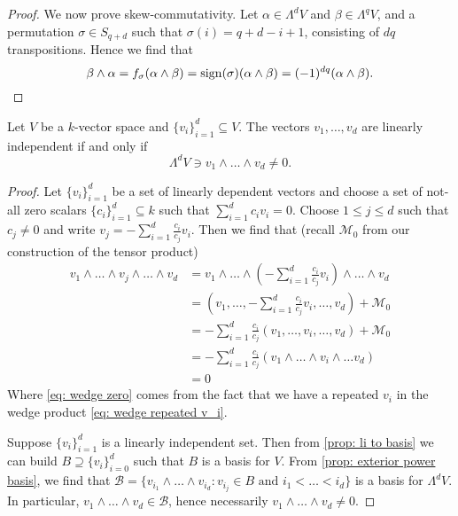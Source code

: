 \begin{proof}
    We now prove skew-commutativity. Let \(\alpha \in \Lambda^d V\) and \(\beta
    \in \Lambda^q V\), and a permutation \(\sigma \in S_{q + d}\) such
    that \(\sigma(i) = q + d - i + 1\), consisting of \(d q\) transpositions.
    Hence we find that
    \[
        \beta \wedge \alpha = f_\sigma(\alpha \wedge \beta)
        = \operatorname{sign}(\sigma)(\alpha \wedge \beta) = (-1)^{d q} (\alpha \wedge \beta).
    \]
\end{proof}

\begin{proposition}\label{prop: li iff wedge nonzero}
    Let \(V\) be a \(k\)-vector space and \(\{v_i\}_{i=1}^d \subseteq V\). The
    vectors \(v_1, \dots, v_d\) are linearly independent if and only if
    \[
        \Lambda^d V \ni v_1 \wedge \dots \wedge v_d \neq 0.
    \]
\end{proposition}

\begin{proof}
    Let \(\{v_i\}_{i=1}^d\) be a set of linearly dependent vectors and choose
    a set of not-all zero scalars \(\{c_i\}_{i=1}^d \subseteq k\) such that
    \(\sum_{i=1}^d c_i v_i = 0\). Choose \(1 \leq j \leq d\) such that \(c_j
    \neq 0\) and write \(v_j = -\sum_{i=1}^d \frac{c_i}{c_j} v_i\). Then we find
    that (recall \(\mathcal M_0\) from our construction of the tensor product)
    \begin{align}
        \nonumber
        v_1 \wedge \dots \wedge v_j \wedge \dots \wedge v_d
         & = v_1 \wedge \dots \wedge \left( - \sum_{i=1}^d \frac{c_i}{c_j} v_i \right)
        \wedge \dots \wedge v_d
        \\
        \nonumber
         & = \left( v_1, \dots, - \sum_{i=1}^d \frac{c_i}{c_j} v_i, \dots, v_d \right)
        + \mathcal M_0                                                                 \\
         & = -\sum_{i=1}^d \frac{c_i}{c_j} (v_1, \dots, v_i, \dots, v_d) + \mathcal
        M_0
        \\
        \label{eq: wedge repeated v_i}
         & = - \sum_{i=1}^d \frac{c_i}{c_j} (v_1 \wedge \dots \wedge v_i \wedge \dots
        v_d)
        \\
        \label{eq: wedge zero}
         & = 0
    \end{align}
    Where \cref{eq: wedge zero} comes from the fact that we have a
    repeated \(v_i\) in the wedge product \cref{eq: wedge repeated v_i}.

    Suppose \(\{v_i\}_{i=1}^d\) is a linearly independent set. Then from
    \cref{prop: li to basis} we can build \(B \supseteq \{v_i\}_{i=0}^d\) such
    that \(B\) is a basis for \(V\). From \cref{prop: exterior power basis}, we
    find that \(\mathcal B = \{v_{i_1} \wedge \dots \wedge v_{i_d} \colon v_{i_j} \in B
    \text{ and } i_1 < \dots < i_d\}\) is a basis for \(\Lambda^d V\). In
    particular, \(v_1 \wedge \dots \wedge v_d \in \mathcal B\), hence necessarily
    \(v_1 \wedge \dots \wedge v_d \neq 0\).
\end{proof}

